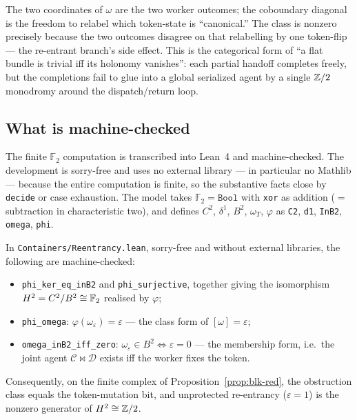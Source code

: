 \begin{remark}
The two coordinates of $\omega$ are the two worker outcomes; the coboundary diagonal is the
freedom to relabel which token-state is ``canonical.'' The class is nonzero precisely
because the two outcomes disagree on that relabelling by one token-flip --- the re-entrant
branch's side effect. This is the categorical form of ``a flat bundle is trivial iff its
holonomy vanishes'': each partial handoff completes freely, but the completions fail to glue
into a global serialized agent by a single $\mathbb{Z}/2$ monodromy around the dispatch/return loop.
\end{remark}

\subsection*{What is machine-checked}

The finite $\mathbb{F}_2$ computation is transcribed into Lean~4 and machine-checked. The
development is sorry-free and uses no external library --- in particular no Mathlib ---
because the entire computation is finite, so the substantive facts close by \texttt{decide}
or case exhaustion. The model takes $\mathbb{F}_2=\texttt{Bool}$ with \texttt{xor} as
addition ($=$ subtraction in characteristic two), and defines $C^2$, $\delta^1$, $B^2$,
$\omega_T$, $\varphi$ as \texttt{C2}, \texttt{d1}, \texttt{InB2}, \texttt{omega},
\texttt{phi}.

\begin{theorem}
\label{thm:blk-lean}
In \texttt{Containers/Reentrancy.lean}, sorry-free and without external libraries, the
following are machine-checked:
\begin{itemize}
\item \texttt{phi\_ker\_eq\_inB2} and \texttt{phi\_surjective}, together giving the
  isomorphism $H^2=C^2/B^2\cong\mathbb{F}_2$ realised by $\varphi$;
\item \texttt{phi\_omega}: $\varphi(\omega_\varepsilon)=\varepsilon$ --- the class form of
  $[\omega]=\varepsilon$;
\item \texttt{omega\_inB2\_iff\_zero}: $\omega_\varepsilon\in B^2\iff\varepsilon=0$ --- the
  membership form, i.e.\ the joint agent $\mathcal C\bowtie\mathcal D$ exists iff the worker
  fixes the token.
\end{itemize}
Consequently, on the finite complex of Proposition~\ref{prop:blk-red}, the obstruction class
equals the token-mutation bit, and unprotected re-entrancy ($\varepsilon=1$) is the nonzero
generator of $H^2\cong\mathbb{Z}/2$.
\end{theorem}


